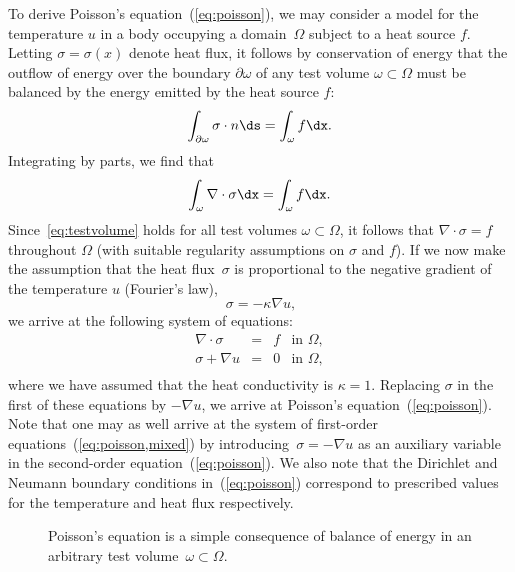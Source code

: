 To derive Poisson's equation~(\ref{eq:poisson}), we may consider a
model for the temperature $u$ in a body occupying a domain~$\Omega$
subject to a heat source $f$. Letting $\sigma = \sigma(x)$ denote heat
flux, it follows by conservation of energy that the outflow of energy
over the boundary $\partial\omega$ of any test volume
$\omega\subset\Omega$ must be balanced by the energy emitted by the
heat source $f$:
\begin{equation}
  \int_{\partial\omega} \sigma \cdot n \ds = \int_{\omega} f \dx.
\end{equation}
Integrating by parts, we find that
\begin{equation} \label{eq:testvolume}
  \int_{\omega} \nabla \cdot \sigma \dx = \int_{\omega} f \dx.
\end{equation}
Since~\eqref{eq:testvolume} holds for all test volumes
$\omega \subset \Omega$, it follows that $\nabla \cdot \sigma = f$
throughout $\Omega$ (with suitable regularity assumptions on $\sigma$
and $f$). If we now make the assumption that the heat flux~$\sigma$ is
proportional to the negative gradient of the temperature $u$
(Fourier's law), 
\begin{equation}\
  \sigma = -\kappa \nabla u,
\end{equation}
we arrive at
the following system of equations:
\begin{equation} \label{eq:poisson,mixed}
  \begin{array}{rcll}
    \nabla \cdot \sigma &=& f &\mbox{in } \Omega, \\
    \sigma + \nabla u &=& 0   &\mbox{in } \Omega, \\
  \end{array}
\end{equation}
where we have assumed that the heat conductivity is $\kappa = 1$.
Replacing $\sigma$ in the first of these equations by $-\nabla u$, we
arrive at Poisson's equation~(\ref{eq:poisson}). Note that one may as
well arrive at the system of first-order
equations~(\ref{eq:poisson,mixed}) by introducing~$\sigma = -\nabla u$
as an auxiliary variable in the second-order
equation~(\ref{eq:poisson}). We also note that the Dirichlet and
Neumann boundary conditions in~(\ref{eq:poisson}) correspond to
prescribed values for the temperature and heat flux respectively.

\begin{figure}
  \begin{center}
    \caption{Poisson's equation is a simple consequence of balance of
      energy in an arbitrary test volume~$\omega \subset \Omega$.}
  \end{center}
\end{figure}

